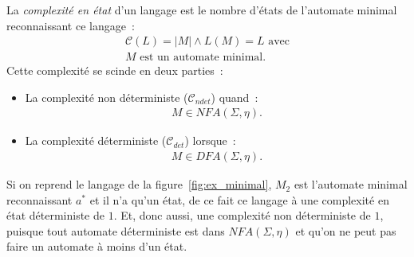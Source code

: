 \begin{definition}
  La \textit{complexité en état} d'un langage est le nombre d'états de
  l'automate minimal reconnaissant ce langage~:
  \begin{gather*}
    \mathcal{C}(L) = \lvert M \rvert \land L(M) = L \text{ avec} \\ 
    M \text{ est un automate minimal.}
  \end{gather*}
  Cette complexité se scinde en deux parties~:

  \vphantom{}

  \begin{itemize}
    \item[\bullet] La complexité non déterministe (\(\mathcal{C}_{ndet}\))
    quand~:
    \begin{align*}
      M \in NFA(\Sigma, \eta).
    \end{align*}
    \item[\bullet] La complexité déterministe (\(\mathcal{C}_{det}\))
    lorsque~:
    \begin{align*}
      M \in DFA(\Sigma, \eta).
    \end{align*}
  \end{itemize}
\end{definition}

\begin{example}
  Si on reprend le langage de la figure~\ref{fig:ex_minimal}, \(M_2\) est
  l'automate minimal reconnaissant \(a^*\) et il n'a qu'un état, de ce fait ce
  langage à une complexité en état déterministe de \(1\). Et, donc aussi, une
  complexité non déterministe de \(1\), puisque tout automate déterministe est
  dans \(NFA(\Sigma, \eta)\) et qu'on ne peut pas faire un automate à moins
  d'un état.
\end{example}


